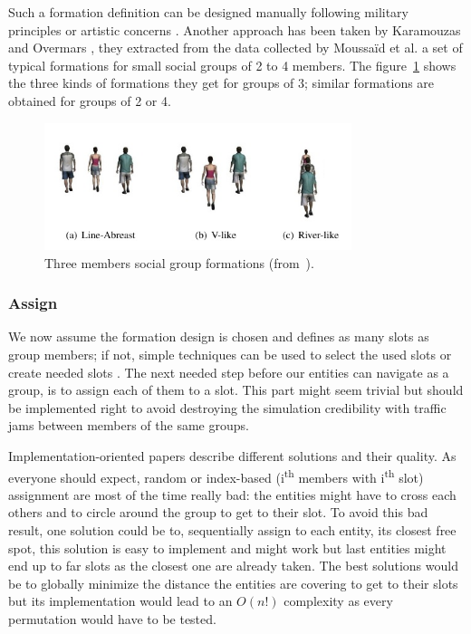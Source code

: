 \documentclass[a4paper,titlepage]{article}
\begin{document}
Such a formation definition can be designed manually following military principles or artistic concerns \cite{Dawson:2002vd,Gu:2011wp}. Another approach has been taken by Karamouzas and Overmars \cite{Karamouzas:2010fi}, they extracted from the data collected by Moussaïd et al. \cite{Moussaid:2010ib} a set of typical formations for small social groups of 2 to 4 members. The figure~\ref{fig:social_group_formations} shows the three kinds of formations they get for groups of 3; similar formations are obtained for groups of 2 or 4. 

\begin{figure}[h]
\centering
\includegraphics[width=0.8\textwidth]{SocialGroupFormations.jpg}
\caption{Three members social group formations (from~\cite{Karamouzas:2010fi}).}
\label{fig:social_group_formations}
\end{figure} 

\subsubsection{Assign}
We now assume the formation design is chosen and defines as many slots as group members; if not, simple techniques can be used to select the used slots or create needed slots \cite{Silveira:2008bc}. The next needed step before our entities can navigate as a group, is to assign each of them to a slot. This part might seem trivial but should be implemented right to avoid destroying the simulation credibility with traffic jams between members of the same groups.

Implementation-oriented papers \cite{Dawson:2002vd,Millington:2006wz} describe different solutions and their quality. As everyone should expect, random or index-based (i\textsuperscript{th} members with i\textsuperscript{th} slot) assignment are most of the time really bad: the entities might have to cross each others and to circle around the group to get to their slot. To avoid this bad result, one solution could be to, sequentially assign to each entity, its closest free spot, this solution is easy to implement and might work but last entities might end up to far slots as the closest one are already taken. The best solutions would be to globally minimize the distance the entities are covering to get to their slots but its implementation would lead to an $O(n!)$ complexity as every permutation would have to be tested. 
\end{document}
